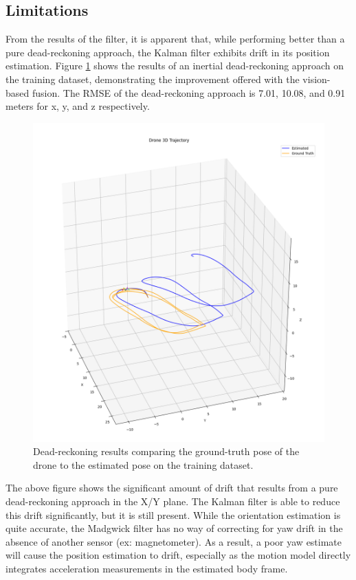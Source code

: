 \documentclass[bare_jrnl_transmag]{subfiles}
\begin{document}
\subsection{Limitations}
From the results of the filter, it is apparent that, while performing better than a pure dead-reckoning approach, the Kalman filter exhibits drift in its position estimation. Figure \ref{fig:dead_reackoning} shows the results of an inertial dead-reckoning approach on the training dataset, demonstrating the improvement offered with the vision-based fusion. The RMSE of the dead-reckoning approach is 7.01, 10.08, and 0.91 meters for x, y, and z respectively.

\begin{figure}[H]
    \centering
    \includegraphics[width=0.8\linewidth]{figures/dead_reckoning_results_training.png}
    \caption{Dead-reckoning results comparing the ground-truth pose of the drone to the estimated pose on the training dataset.}
    \label{fig:dead_reackoning}
\end{figure}

The above figure shows the significant amount of drift that results from a pure dead-reckoning approach in the X/Y plane. The Kalman filter is able to reduce this drift significantly, but it is still present. While the orientation estimation is quite accurate, the Madgwick filter has no way of correcting for yaw drift in the absence of another sensor (ex: magnetometer). As a result, a poor yaw estimate will cause the position estimation to drift, especially as the motion model directly integrates acceleration measurements in the estimated body frame. 
\end{document}

